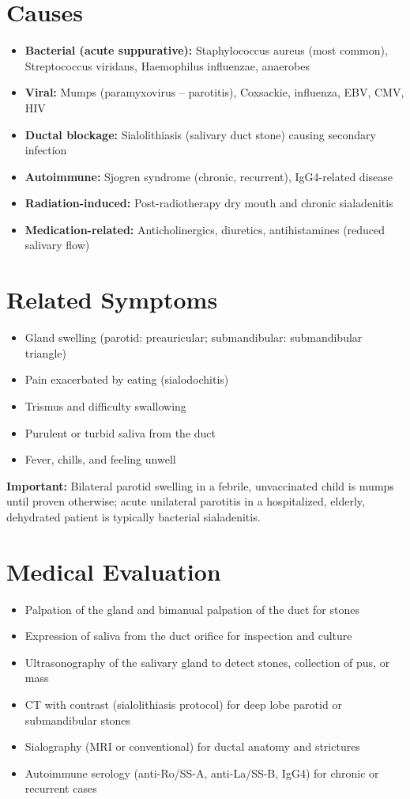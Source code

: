 \section*{Causes}
\begin{itemize}
  \item \textbf{Bacterial (acute suppurative):} Staphylococcus aureus (most common), Streptococcus viridans, Haemophilus influenzae, anaerobes
  \item \textbf{Viral:} Mumps (paramyxovirus -- parotitis), Coxsackie, influenza, EBV, CMV, HIV
  \item \textbf{Ductal blockage:} Sialolithiasis (salivary duct stone) causing secondary infection
  \item \textbf{Autoimmune:} Sjogren syndrome (chronic, recurrent), IgG4-related disease
  \item \textbf{Radiation-induced:} Post-radiotherapy dry mouth and chronic sialadenitis
  \item \textbf{Medication-related:} Anticholinergics, diuretics, antihistamines (reduced salivary flow)
\end{itemize}

\section*{Related Symptoms}
\begin{itemize}
  \item Gland swelling (parotid: preauricular; submandibular: submandibular triangle)
  \item Pain exacerbated by eating (sialodochitis)
  \item Trismus and difficulty swallowing
  \item Purulent or turbid saliva from the duct
  \item Fever, chills, and feeling unwell
\end{itemize}
\textbf{Important:} Bilateral parotid swelling in a febrile, unvaccinated child is mumps until proven otherwise; acute unilateral parotitis in a hospitalized, elderly, dehydrated patient is typically bacterial sialadenitis.

\section*{Medical Evaluation}
\begin{itemize}
  \item Palpation of the gland and bimanual palpation of the duct for stones
  \item Expression of saliva from the duct orifice for inspection and culture
  \item Ultrasonography of the salivary gland to detect stones, collection of pus, or mass
  \item CT with contrast (sialolithiasis protocol) for deep lobe parotid or submandibular stones
  \item Sialography (MRI or conventional) for ductal anatomy and strictures
  \item Autoimmune serology (anti-Ro/SS-A, anti-La/SS-B, IgG4) for chronic or recurrent cases
\end{itemize}

